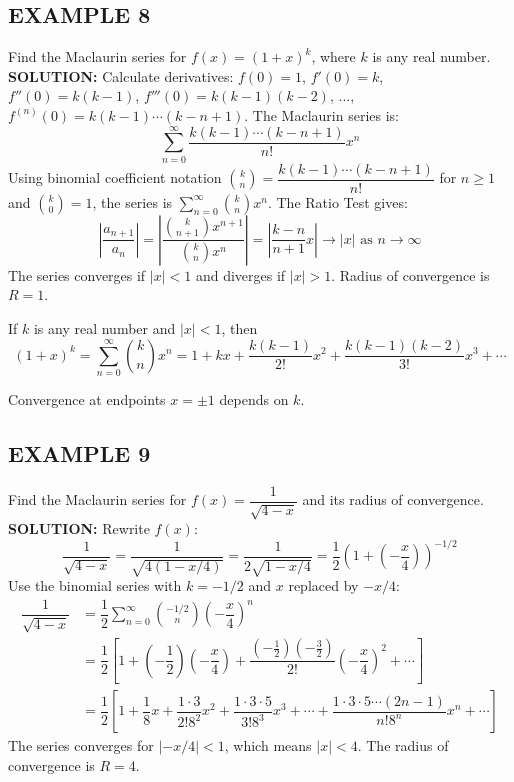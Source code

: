 \documentclass{article}
\theoremstyle{mystyle}
\begin{document}
\subsection*{EXAMPLE 8}
Find the Maclaurin series for \(f(x) = (1+x)^k\), where \(k\) is any real number.\\
\textbf{SOLUTION:}
Calculate derivatives: \(f(0)=1\), \(f'(0)=k\), \(f''(0)=k(k-1)\), \(f'''(0)=k(k-1)(k-2)\), ..., \(f^{(n)}(0)=k(k-1)\cdots(k-n+1)\).
The Maclaurin series is:
\[ \sum_{n=0}^{\infty} \dfrac{k(k-1)\cdots(k-n+1)}{n!} x^n \]
Using binomial coefficient notation \( \binom{k}{n} = \dfrac{k(k-1)\cdots(k-n+1)}{n!} \) for \(n \ge 1\) and \( \binom{k}{0}=1 \), the series is \( \sum_{n=0}^{\infty} \binom{k}{n} x^n \).
The Ratio Test gives:
\[ \left| \dfrac{a_{n+1}}{a_n} \right| = \left| \dfrac{\binom{k}{n+1} x^{n+1}}{\binom{k}{n} x^n} \right| = \left| \dfrac{k-n}{n+1} x \right| \to |x| \text{ as } n \to \infty \]
The series converges if \(|x|<1\) and diverges if \(|x|>1\). Radius of convergence is \(R=1\).

\begin{tcolorbox}[
    colback=white,
    colframe=orange!80!white,
    title=Theorem 5,
    boxrule=0.5mm,
    arc=3mm
    ]
    If \(k\) is any real number and \(|x| < 1\), then
    \[ (1+x)^k = \sum_{n=0}^{\infty} \binom{k}{n} x^n = 1 + kx + \dfrac{k(k-1)}{2!}x^2 + \dfrac{k(k-1)(k-2)}{3!}x^3 + \cdots \]
\end{tcolorbox}
Convergence at endpoints \(x=\pm 1\) depends on \(k\).

\subsection*{EXAMPLE 9}
Find the Maclaurin series for \(f(x) = \dfrac{1}{\sqrt{4-x}}\) and its radius of convergence.\\
\textbf{SOLUTION:}
Rewrite \(f(x)\):
\[ \dfrac{1}{\sqrt{4-x}} = \dfrac{1}{\sqrt{4(1-x/4)}} = \dfrac{1}{2\sqrt{1-x/4}} = \dfrac{1}{2} \left(1 + \left(-\dfrac{x}{4}\right)\right)^{-1/2} \]
Use the binomial series with \(k=-1/2\) and \(x\) replaced by \(-x/4\):
\begin{align*}
 \dfrac{1}{\sqrt{4-x}} &= \dfrac{1}{2} \sum_{n=0}^{\infty} \binom{-1/2}{n} \left(-\dfrac{x}{4}\right)^n \\
 &= \dfrac{1}{2} \left[ 1 + \left(-\dfrac{1}{2}\right)\left(-\dfrac{x}{4}\right) + \dfrac{(-\frac{1}{2})(-\frac{3}{2})}{2!}\left(-\dfrac{x}{4}\right)^2 + \cdots \right] \\
 &= \dfrac{1}{2} \left[ 1 + \dfrac{1}{8}x + \dfrac{1 \cdot 3}{2! 8^2} x^2 + \dfrac{1 \cdot 3 \cdot 5}{3! 8^3} x^3 + \cdots + \dfrac{1 \cdot 3 \cdot 5 \cdots (2n-1)}{n! 8^n} x^n + \cdots \right]
\end{align*}
The series converges for \(|-x/4| < 1\), which means \(|x|<4\). The radius of convergence is \(R=4\).
\end{document}

